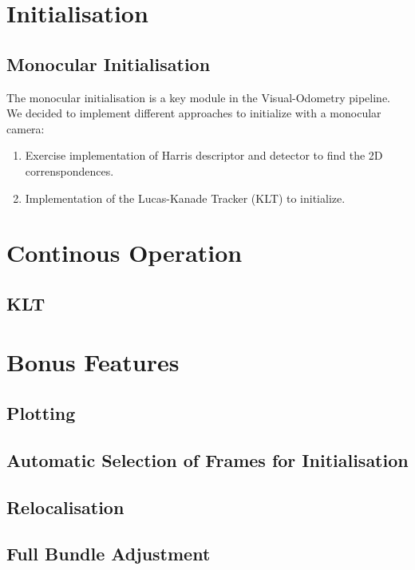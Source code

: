 \section{Initialisation}
\label{s:Initialisation}

\subsection{Monocular Initialisation}
The monocular initialisation is a key module in the Visual-Odometry pipeline.
We decided to implement different approaches to initialize with a monocular camera:

\begin{enumerate}
\item Exercise implementation of Harris descriptor and detector to find the 2D correnspondences.
\item Implementation of the Lucas-Kanade Tracker (KLT) to initialize.
\end{enumerate}

\section{Continous Operation}
\label{s:ContOp}

\subsection{KLT}

\section{Bonus Features}
\label{s:BF}

\subsection{Plotting}

\subsection{Automatic Selection of Frames for Initialisation}

\subsection{Relocalisation}

\subsection{Full Bundle Adjustment}

